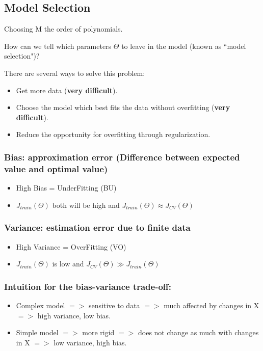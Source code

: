 \subsection{Model Selection}
Choosing M the order of polynomials.

How can we tell which parameters $\Theta$ to leave in the model (known as ``model selection")?

There are several ways to solve this problem:

\begin{itemize}
\item Get more data (\textbf{very difficult}).
\item Choose the model which best fits the data without overfitting (\textbf{very difficult}).
\item Reduce the opportunity for overfitting through regularization.
\end{itemize}

\subsubsection{Bias: approximation error (Difference between expected value and optimal value)}
\begin{itemize}
\item High Bias = UnderFitting (BU)
\item $J_{train}(\Theta)$ both will be high and $J_{train}(\Theta)\approx J_{CV}(\Theta)$
\end{itemize}
\subsubsection{Variance: estimation error due to finite data}
\begin{itemize}
\item High Variance = OverFitting (VO)
\item $J_{train}(\Theta)$ is low and $J_{CV}(\Theta) \gg J_{train}(\Theta)$
\end{itemize}
\subsubsection{Intuition for the bias-variance trade-off:}
\begin{itemize}
\item Complex model $=>$ sensitive to data $=>$ much affected by changes in X $=>$ high variance, low bias.
\item Simple model $=>$ more rigid $=>$ does not change as much with changes in X $=>$ low variance, high bias.
\end{itemize}

